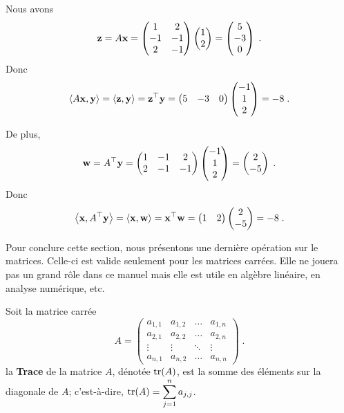 {\begin{egg}
Nous avons
\[
\mathbf{z} = A\mathbf{x} = \begin{pmatrix} 1 & 2 \\ -1 & -1 \\ 2 & -1 \end{pmatrix}
\begin{pmatrix} 1 \\ 2 \end{pmatrix} =
\begin{pmatrix}  5 \\ -3 \\ 0 \end{pmatrix} \; .
\]
Donc
\[
\left\langle{A\mathbf{x}} , {\mathbf{y}}\right\rangle = \left\langle{\mathbf{z}} , {\mathbf{y}}\right\rangle
= \mathbf{z}^\top \mathbf{y} =
\begin{pmatrix}  5 & -3 & 0 \end{pmatrix}
\begin{pmatrix} -1 \\ 1 \\ 2 \end{pmatrix}
= -8 \; .
\]

De plus,
\[
\mathbf{w} = A^\top\mathbf{y} =
\begin{pmatrix} 1 & -1 & 2 \\  2 & -1 & -1 \end{pmatrix}
\begin{pmatrix} -1 \\ 1 \\ 2 \end{pmatrix} =
\begin{pmatrix}  2 \\ -5 \end{pmatrix} \; .
\]
Donc
\[
\left\langle{\mathbf{x}} , {A^\top\mathbf{y}}\right\rangle = \left\langle{\mathbf{x}} , {\mathbf{w}}\right\rangle
= \mathbf{x}^\top \mathbf{w} =
\begin{pmatrix} 1 & 2 \end{pmatrix}
\begin{pmatrix} 2 \\ -5 \end{pmatrix}
= -8 \; .
\]
\end{egg}

Pour conclure cette section, nous présentons une dernière opération sur
le matrices.  Celle-ci est valide seulement pour les matrices carrées.
Elle ne jouera pas un grand rôle dans ce manuel mais elle est utile en
algèbre linéaire, en analyse numérique, etc.

\begin{defn} 
Soit la matrice carrée
\[
A =
\begin{pmatrix}
a_{1,1} & a_{1,2} &\ldots & a_{1,n} \\
a_{2,1} & a_{2,2} & \ldots & a_{2,n} \\
\vdots & \vdots & \ddots & \vdots \\
a_{n,1} & a_{n,2} & \ldots & a_{n,n}
\end{pmatrix} \; .
\]
la {\bfseries Trace} de la matrice $A$, dénotée $\operatorname{tr}(A)$, est la somme
des éléments sur la diagonale de $A$; c'est-à-dire,
$\displaystyle \operatorname{tr}(A) = \sum_{j=1}^n a_{j,j}$.
\end{defn}

}
